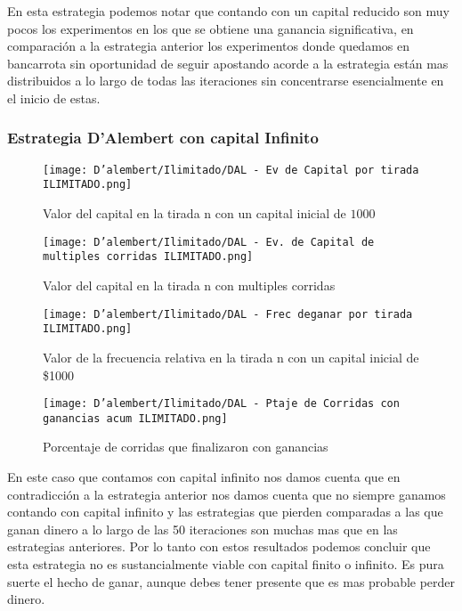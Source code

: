 \documentclass{article}
\begin{document}
En esta estrategia podemos notar que contando con un capital reducido son muy pocos los experimentos en los que se obtiene una ganancia significativa, en comparación a la estrategia anterior los experimentos donde quedamos en bancarrota sin oportunidad de seguir apostando acorde a la estrategia están mas distribuidos a lo largo de todas las
iteraciones sin concentrarse esencialmente en el inicio de estas.

\subsubsection{Estrategia D’Alembert con capital Infinito}

\begin{figure}
    \centering
    \texttt{[image: D'alembert/Ilimitado/DAL - Ev de Capital por tirada ILIMITADO.png]}
    \caption{Valor del capital en la tirada n con un capital inicial de $1000$}
    \label{fig:enter-label}
\end{figure}
\begin{figure}
        \centering
        \texttt{[image: D'alembert/Ilimitado/DAL - Ev. de Capital de multiples corridas ILIMITADO.png]}
        \caption{Valor del capital en la tirada n con multiples corridas}
        \label{fig:enter-label}
    \end{figure}    

\begin{figure}
    \centering
    \texttt{[image: D'alembert/Ilimitado/DAL - Frec deganar por tirada ILIMITADO.png]}
    \caption{Valor de la frecuencia relativa en la tirada n con un capital inicial de \$1000}
    \label{fig:enter-label}
\end{figure}

\begin{figure}
    \centering
    \texttt{[image: D'alembert/Ilimitado/DAL - Ptaje de Corridas con ganancias acum ILIMITADO.png]}
    \caption{Porcentaje de corridas que finalizaron con ganancias}
    \label{fig:enter-label}
\end{figure}
En este caso que contamos con capital infinito nos damos cuenta que en contradicción a la estrategia anterior nos damos cuenta que no siempre ganamos contando con capital infinito y las estrategias que pierden comparadas a las que ganan dinero a lo largo de las 50 iteraciones son muchas mas que en las estrategias anteriores. Por lo tanto con estos resultados podemos concluir que esta estrategia no es sustancialmente viable con capital finito o infinito. Es pura suerte el hecho de ganar, aunque debes tener presente que es mas probable perder dinero.
\end{document}
